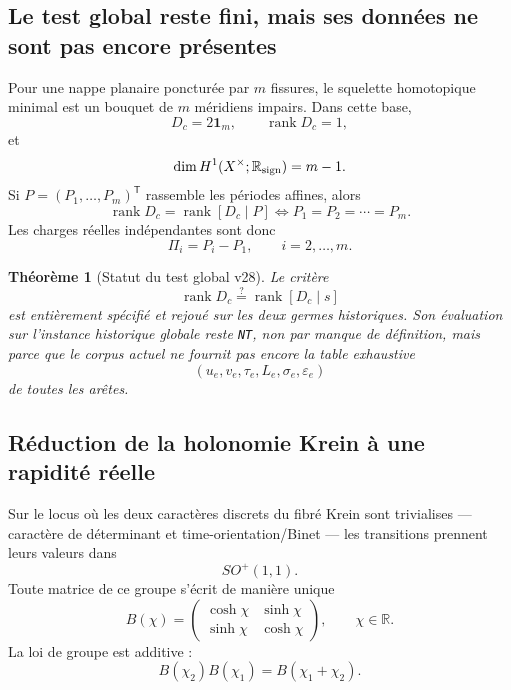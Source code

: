 \documentclass[11pt,a4paper]{article}
\newtheorem{theorem}{Théorème}[section]
\newcommand{\rank}{\operatorname{rank}}
\newcommand{\certNT}{\texttt{NT}}
\begin{document}
\subsection{Le test global reste fini, mais ses données ne sont pas encore présentes}

Pour une nappe planaire poncturée par $m$ fissures, le squelette homotopique minimal est un bouquet de $m$ méridiens impairs. Dans cette base,
\[
 D_c=2\mathbf1_m,
 \qquad
 \rank D_c=1,
\]
et
\[
 \dim H^1(X^\times;\mathbb R_{\rm sign})=m-1.
\]
Si $P=(P_1,\ldots,P_m)^{\mathsf T}$ rassemble les périodes affines, alors
\begin{equation}\label{eq:v28-planar-rank}
 \boxed{
 \rank D_c=\rank[D_c\mid P]
 \iff
 P_1=P_2=\cdots=P_m.}
\end{equation}
Les charges réelles indépendantes sont donc
\[
 \boxed{
 \Pi_i=P_i-P_1,
 \qquad i=2,\ldots,m.}
\]

\begin{theorem}[Statut du test global v28]\label{thm:v28-global-rank-status}
Le critère
\[
 \rank D_c\stackrel?=\rank[D_c\mid s]
\]
est entièrement spécifié et rejoué sur les deux germes historiques. Son évaluation sur l'instance historique globale reste \certNT{}, non par manque de définition, mais parce que le corpus actuel ne fournit pas encore la table exhaustive
\[
 (u_e,v_e,\tau_e,L_e,\sigma_e,\varepsilon_e)
\]
de toutes les arêtes.
\end{theorem}

\subsection{Réduction de la holonomie Krein à une rapidité réelle}

Sur le locus où les deux caractères discrets du fibré Krein sont trivialises --- caractère de déterminant et time-orientation/Binet --- les transitions prennent leurs valeurs dans
\[
 SO^+(1,1).
\]
Toute matrice de ce groupe s'écrit de manière unique
\begin{equation}\label{eq:v28-boost}
 \boxed{
 B(\chi)
 =
 \begin{pmatrix}
 \cosh\chi&\sinh\chi\\
 \sinh\chi&\cosh\chi
 \end{pmatrix},
 \qquad \chi\in\mathbb R.}
\end{equation}
La loi de groupe est additive :
\[
 \boxed{B(\chi_2)B(\chi_1)=B(\chi_1+\chi_2).}
\]
\end{document}
